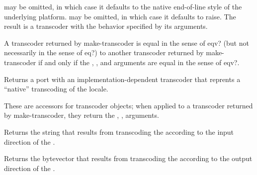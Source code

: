 \begin{entry}{%
}

   may be omitted, in
which case it defaults to the native end-of-line style of the
underlying platform.   may be omitted, in which
case it defaults to {\cf raise}.  The result is a transcoder with the
behavior specified by its arguments.

A transcoder returned by {\cf make-transcoder} is equal in the sense
of {\cf eqv?} (but not necessarily in the sense of {\cf eq?})
to another transcoder returned by {\cf
  make-transcoder} if and only if the , ,
and  arguments are equal in the sense of {\cf
  eqv?}.
\end{entry}

\begin{entry}{
}

Returns a port with an implementation-dependent transcoder that
reprents a ``native'' transcoding of the locale.
\end{entry}

\begin{entry}{%
}

These are accessors for transcoder objects; when applied to a
transcoder returned by {\cf make-transcoder}, they return the
, ,  arguments.
\end{entry}

\begin{entry}{%
}

Returns the string that results from transcoding the
 according to the input direction of
the .
\end{entry}

\begin{entry}{%
}

Returns the bytevector that results from transcoding the
 according to the output direction of
the .
\end{entry}


